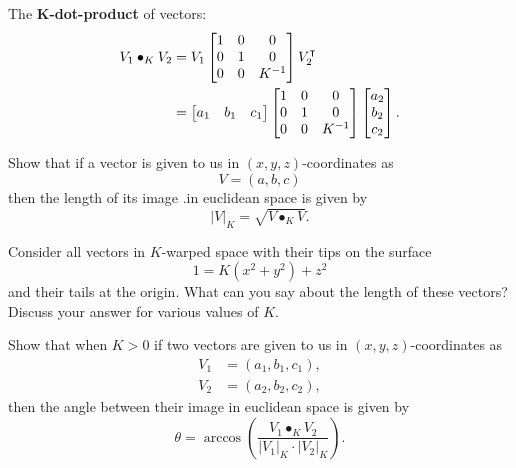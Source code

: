 \documentclass{ximera}
\begin{document}
\begin{definition}
The \textbf{$\boldsymbol{K}$-dot-product} of vectors:%
\begin{align*}
V_{1}\bullet_{K}V_{2}  &=V_{1} 
\begin{bmatrix}
1 & 0 & 0\\
0 & 1 & 0\\
0 & 0 & K^{-1}%
\end{bmatrix}
V_{2}^\transpose\\
&=
\begin{bmatrix}
a_{1} & b_{1} & c_{1}%
\end{bmatrix}
\begin{bmatrix}
1 & 0 & 0\\
0 & 1 & 0\\
0 & 0 & K^{-1}%
\end{bmatrix}
\begin{bmatrix}
a_{2}\\
b_{2}\\
c_{2}%
\end{bmatrix}.
\end{align*}

\end{definition}

\begin{problem}
  Show that if a vector is given to us in $(x,y,z)$-coordinates as%
\[
V =\left(a,b,c\right)
\]
then the length of its image .in euclidean space is given by
\[
|V|_K=\sqrt{V\bullet_K V}.
\]
\end{problem}

\begin{problem}
  Consider all vectors in $K$-warped space with their tips on the
  surface
  \[
  1=K(x^2+y^2)+z^2
  \]
  and their tails at the origin. What can you say about the length of
  these vectors? Discuss your answer for various values of $K$.
\end{problem}


\begin{problem}
  Show that when $K>0$ if two vectors are given to us in $(x,y,z)$-coordinates as%
\begin{align*}
V_{1}  &=\left(  a_{1},b_{1},c_{1}\right), \\
V_{2}  &=\left(  a_{2},b_{2},c_{2}\right),
\end{align*}
then the angle between their image in euclidean space is given by
\[
\theta = \arccos\left(\frac{V_1\bullet_K V_2}{\left| V_1\right|_K \cdot\left|V_2\right|_K }\right).
\]
\end{problem}
\end{document}
